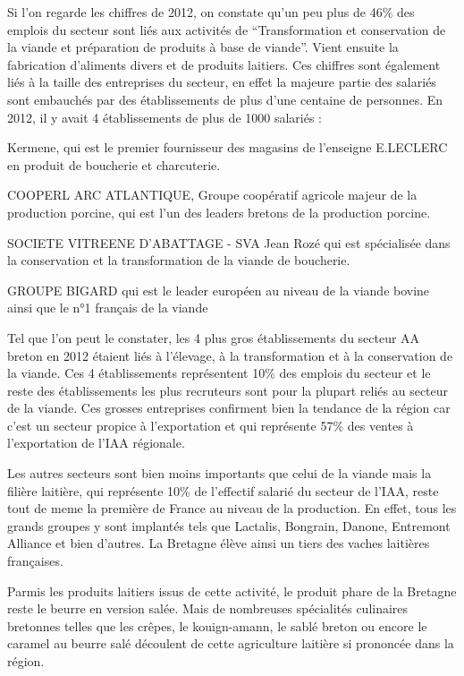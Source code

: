 \documentclass[a4paper,12pt]{report}
\begin{document}
			Si l’on regarde les chiffres de 2012, on constate qu’un peu plus de 46\% des emplois du secteur sont liés aux activités de  “Transformation et conservation de la viande et préparation de produits à base de viande”. Vient ensuite la fabrication d’aliments divers et de produits laitiers. Ces chiffres sont également liés à la taille des entreprises du secteur, en effet la majeure partie des salariés sont embauchés par des établissements de plus d’une centaine de personnes. En 2012, il y avait 4 établissements de plus de 1000 salariés :
			\begin{list}{•}{}
			\item Kermene, qui est le premier fournisseur des magasins de l’enseigne E.LECLERC en produit de boucherie et charcuterie.
			\item COOPERL ARC ATLANTIQUE, Groupe coopératif agricole majeur de la production porcine, qui est l’un des leaders bretons de la production porcine.
			\item SOCIETE VITREENE D’ABATTAGE - SVA Jean Rozé qui est spécialisée dans la conservation et la transformation de la viande de boucherie.
			\item GROUPE BIGARD qui est le leader européen au niveau de la viande bovine ainsi que le n°1 français de la viande\cite{BigardPremierTransformateurViande}
			\end{list}
			
			Tel que l’on peut le constater, les 4 plus gros établissements du secteur AA breton en 2012 étaient liés à l’élevage, à la transformation et à la conservation de la viande. Ces 4 établissements représentent 10\% des emplois du secteur et le reste des établissements les plus recruteurs sont pour la plupart reliés au secteur de la viande. Ces grosses entreprises confirment bien la tendance de la région car c’est un secteur propice à l’exportation et qui représente 57\% des ventes à l’exportation de l’IAA régionale.
			
			Les autres secteurs sont bien moins importants que celui de la viande mais la filière laitière, qui représente 10\% de l’effectif salarié du secteur de l’IAA, reste tout de meme la première de France au niveau de la production. En effet, tous les grands groupes y sont implantés tels que Lactalis, Bongrain, Danone, Entremont Alliance et bien d’autres\cite{ProduitsLaitiersRegionBretagne}. La Bretagne élève ainsi un tiers des vaches laitières françaises.
			
			Parmis les produits laitiers issus de cette activité, le produit phare de la Bretagne reste le beurre en version salée. Mais de nombreuses spécialités culinaires bretonnes telles que les crêpes, le kouign-amann, le sablé breton ou encore le caramel au beurre salé découlent de cette agriculture laitière si prononcée dans la région.
			
\end{document}
